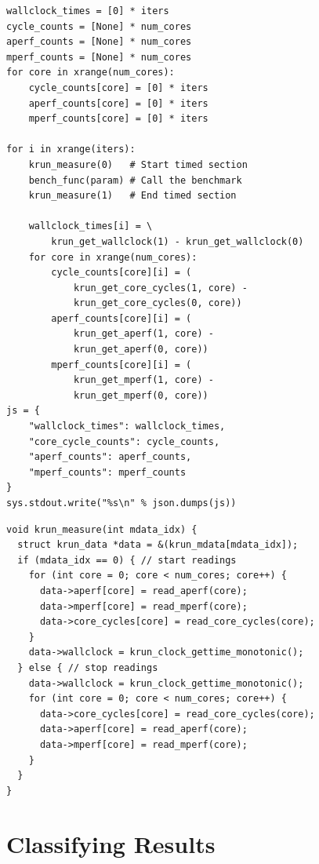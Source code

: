 \documentclass[preprint,numbers,10pt]{sigplanconf}
\begin{document}
\begin{lstlisting}[label=lst:pyiter, caption={The Python in-process iterations runner.}]
wallclock_times = [0] * iters
cycle_counts = [None] * num_cores
aperf_counts = [None] * num_cores
mperf_counts = [None] * num_cores
for core in xrange(num_cores):
    cycle_counts[core] = [0] * iters
    aperf_counts[core] = [0] * iters
    mperf_counts[core] = [0] * iters

for i in xrange(iters):
    krun_measure(0)   # Start timed section
    bench_func(param) # Call the benchmark
    krun_measure(1)   # End timed section

    wallclock_times[i] = \
        krun_get_wallclock(1) - krun_get_wallclock(0)
    for core in xrange(num_cores):
        cycle_counts[core][i] = (
            krun_get_core_cycles(1, core) -
            krun_get_core_cycles(0, core))
        aperf_counts[core][i] = (
            krun_get_aperf(1, core) -
            krun_get_aperf(0, core))
        mperf_counts[core][i] = (
            krun_get_mperf(1, core) -
            krun_get_mperf(0, core))
js = {
    "wallclock_times": wallclock_times,
    "core_cycle_counts": cycle_counts,
    "aperf_counts": aperf_counts,
    "mperf_counts": mperf_counts
}
sys.stdout.write("%s\n" % json.dumps(js))
\end{lstlisting}

\begin{lstlisting}[label=lst:krun-measure, xleftmargin=0cm,
        caption={The C code responsible for taking measurements. Wallclock time
                 is most important, so this is the innermost measurement.}]
void krun_measure(int mdata_idx) {
  struct krun_data *data = &(krun_mdata[mdata_idx]);
  if (mdata_idx == 0) { // start readings
    for (int core = 0; core < num_cores; core++) {
      data->aperf[core] = read_aperf(core);
      data->mperf[core] = read_mperf(core);
      data->core_cycles[core] = read_core_cycles(core);
    }
    data->wallclock = krun_clock_gettime_monotonic();
  } else { // stop readings
    data->wallclock = krun_clock_gettime_monotonic();
    for (int core = 0; core < num_cores; core++) {
      data->core_cycles[core] = read_core_cycles(core);
      data->aperf[core] = read_aperf(core);
      data->mperf[core] = read_mperf(core);
    }
  }
}
\end{lstlisting}

\section{Classifying Results}
\label{sec:Results}
\end{document}
